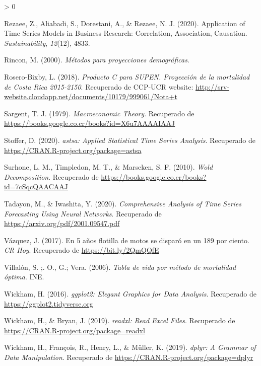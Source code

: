 \documentclass[
]{article}
\newlength{\cslhangindent}
\newenvironment{CSLReferences}[2] %
 {%
  \setlength{\parindent}{0pt}
  \ifodd #1 \everypar{\setlength{\hangindent}{\cslhangindent}}\ignorespaces\fi
  \ifnum #2 > 0
  \setlength{\parskip}{#2\baselineskip}
  \fi
 }%
 {}
\begin{document}
\begin{CSLReferences}{1}{0}
\leavevmode\hypertarget{ref-tsa_decision_making}{}%
Rezaee, Z., Aliabadi, S., Dorestani, A., \& Rezaee, N. J. (2020).
Application of Time Series Models in Business Research: Correlation,
Association, Causation. \emph{Sustainability}, \emph{12}(12), 4833.

\leavevmode\hypertarget{ref-Rincon}{}%
Rincon, M. (2000). \emph{Métodos para proyecciones demográficas}.

\leavevmode\hypertarget{ref-supenprodc}{}%
Rosero-Bixby, L. (2018). \emph{Producto C para SUPEN. Proyección de la
mortalidad de Costa Rica 2015-2150}. Recuperado de CCP-UCR website:
\url{http://srv-website.cloudapp.net/documents/10179/999061/Nota+t}

\leavevmode\hypertarget{ref-sargent_macro}{}%
Sargent, T. J. (1979). \emph{Macroeconomic Theory}. Recuperado de
\url{https://books.google.co.cr/books?id=X6u7AAAAIAAJ}

\leavevmode\hypertarget{ref-astsa}{}%
Stoffer, D. (2020). \emph{astsa: Applied Statistical Time Series
Analysis}. Recuperado de \url{https://CRAN.R-project.org/package=astsa}

\leavevmode\hypertarget{ref-Wold}{}%
Surhone, L. M., Timpledon, M. T., \& Marseken, S. F. (2010). \emph{Wold
Decomposition}. Recuperado de
\url{https://books.google.co.cr/books?id=7cSqcQAACAAJ}

\leavevmode\hypertarget{ref-redes}{}%
Tadayon, M., \& Iwashita, Y. (2020). \emph{Comprehensive Analysis of
Time Series Forecasting Using Neural Networks}. Recuperado de
\url{https://arxiv.org/pdf/2001.09547.pdf}

\leavevmode\hypertarget{ref-motos}{}%
Vázquez, J. (2017). En 5 años flotilla de motos se disparó en un 189 por
ciento. \emph{CR Hoy}. Recuperado de \url{https://bit.ly/2QmQQfE}

\leavevmode\hypertarget{ref-mortalidad_optima}{}%
Villalón, S. ;. O., G.; Vera. (2006). \emph{Tabla de vida por método de
mortalidad óptima}. INE.

\leavevmode\hypertarget{ref-ggplot2}{}%
Wickham, H. (2016). \emph{ggplot2: Elegant Graphics for Data Analysis}.
Recuperado de \url{https://ggplot2.tidyverse.org}

\leavevmode\hypertarget{ref-readxl}{}%
Wickham, H., \& Bryan, J. (2019). \emph{readxl: Read Excel Files}.
Recuperado de \url{https://CRAN.R-project.org/package=readxl}

\leavevmode\hypertarget{ref-dplyr}{}%
Wickham, H., François, R., Henry, L., \& Müller, K. (2019). \emph{dplyr:
A Grammar of Data Manipulation}. Recuperado de
\url{https://CRAN.R-project.org/package=dplyr}


\end{CSLReferences}
\end{document}
